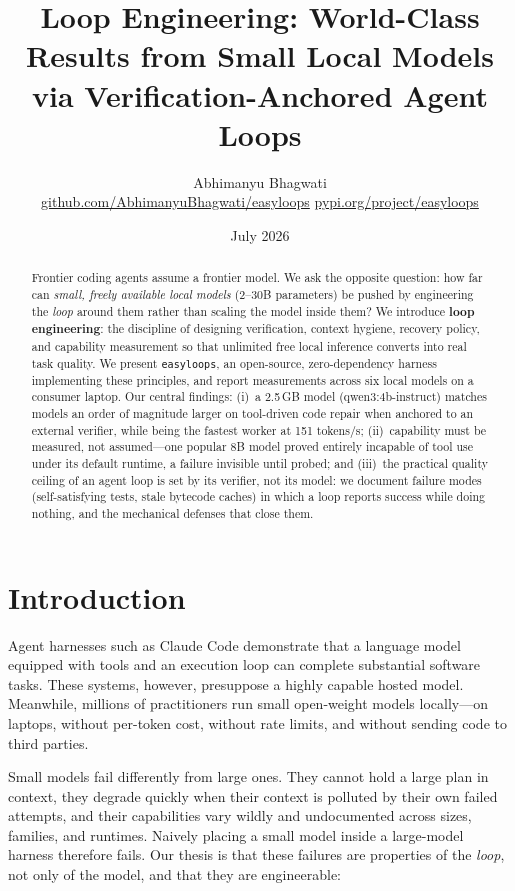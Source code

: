 \documentclass[11pt]{article}
\title{\textbf{Loop Engineering: World-Class Results from Small Local Models\\
via Verification-Anchored Agent Loops}}
\author{Abhimanyu Bhagwati\\
\small\href{https://github.com/AbhimanyuBhagwati/easyloops}{github.com/AbhimanyuBhagwati/easyloops}
\quad\href{https://pypi.org/project/easyloops/}{pypi.org/project/easyloops}}
\date{July 2026}
\newcommand{\el}{\texttt{easyloops}}
\begin{document}
\maketitle

\begin{abstract}
Frontier coding agents assume a frontier model. We ask the opposite question: how far can
\emph{small, freely available local models} (2--30B parameters) be pushed by engineering the
\emph{loop} around them rather than scaling the model inside them? We introduce
\textbf{loop engineering}: the discipline of designing verification, context hygiene, recovery
policy, and capability measurement so that unlimited free local inference converts into real
task quality. We present \el{}, an open-source, zero-dependency harness implementing these
principles, and report measurements across six local models on a consumer laptop. Our central
findings: (i)~a 2.5\,GB model (qwen3:4b-instruct) matches models an order of magnitude larger
on tool-driven code repair when anchored to an external verifier, while being the fastest
worker at 151 tokens/s; (ii)~capability must be measured, not assumed---one popular 8B model
proved entirely incapable of tool use under its default runtime, a failure invisible until
probed; and (iii)~the practical quality ceiling of an agent loop is set by its verifier, not
its model: we document failure modes (self-satisfying tests, stale bytecode caches) in which a
loop reports success while doing nothing, and the mechanical defenses that close them.
\end{abstract}

\section{Introduction}

Agent harnesses such as Claude Code demonstrate that a language model equipped with tools and
an execution loop can complete substantial software tasks. These systems, however, presuppose a
highly capable hosted model. Meanwhile, millions of practitioners run small open-weight models
locally---on laptops, without per-token cost, without rate limits, and without sending code to
third parties.

Small models fail differently from large ones. They cannot hold a large plan in context, they
degrade quickly when their context is polluted by their own failed attempts, and their
capabilities vary wildly and undocumented across sizes, families, and runtimes. Naively placing
a small model inside a large-model harness therefore fails. Our thesis is that these failures
are properties of the \emph{loop}, not only of the model, and that they are engineerable:
\end{document}
